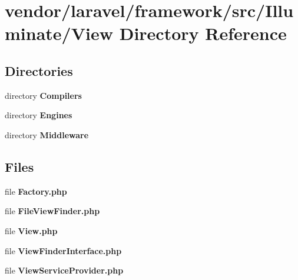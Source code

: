 \section{vendor/laravel/framework/src/\+Illuminate/\+View Directory Reference}
\label{dir_f7df51e774e676e4cea4acfe2d7188eb}
\subsection*{Directories}
\begin{DoxyCompactItemize}
\item 
directory {\bf Compilers}
\item 
directory {\bf Engines}
\item 
directory {\bf Middleware}
\end{DoxyCompactItemize}
\subsection*{Files}
\begin{DoxyCompactItemize}
\item 
file {\bf Factory.\+php}
\item 
file {\bf File\+View\+Finder.\+php}
\item 
file {\bf View.\+php}
\item 
file {\bf View\+Finder\+Interface.\+php}
\item 
file {\bf View\+Service\+Provider.\+php}
\end{DoxyCompactItemize}
